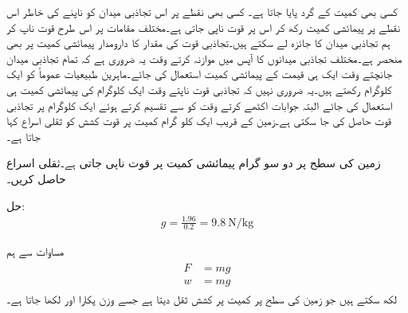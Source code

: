 کسی بھی کمیت  کے گرد   پایا جاتا ہے۔ کسی بھی نقطے پر  اس تجاذبی میدان کو ناپنے کی خاطر اس نقطے پر پیمائشی کمیت  رکھ کر اس پر قوت ناپی جاتی ہے۔مختلف مقامات پر اس طرح قوت ناپ کر ہم تجاذبی میدان کا جائزہ لے سکتے ہیں۔تجاذبی قوت کی مقدار کا دارومدار پیمائشی کمیت   پر بھی منحصر ہے۔مختلف تجاذبی میدانوں کا آپس میں موازنہ کرتے وقت یہ ضروری ہے کہ تمام تجاذبی میدان جانچتے وقت ایک ہی قیمت کے پیمائشی کمیت استعمال کی جائے۔ماہرین طبیعیات عموماً  کو ایک کلوگرام  رکھتے ہیں۔یہ ضروری نہیں کہ تجاذبی قوت ناپتے وقت ایک کلوگرام کی پیمائشی کمیت ہی استعمال کی جائے البتہ جوابات اکٹھے کرتے وقت  کو  سے تقسیم کرتے ہوئے ایک کلوگرام پر تجاذبی قوت حاصل کی جا سکتی ہے۔زمین کے قریب ایک کلو گرام کمیت پر قوت کشش کو ثقلی اسراع  کہا جاتا ہے۔

زمین کی سطح پر دو سو گرام پیمائشی کمیت پر  قوت ناپی جاتی ہے۔ثقلی اسراع حاصل کریں۔

حل:
\begin{align}
g=\frac{1.96}{0.2}=\SI{9.8}{\newton \per \kilogram}
\end{align}   

مساوات  سے ہم
\begin{gather}
\begin{aligned}
F&=m g\\
w&=m g
\end{aligned}
\end{gather}
لکھ سکتے ہیں جو زمین کی  سطح پر کمیت  پر کشش ثقل  دیتا ہے جسے  وزن پکارا اور   لکھا جاتا ہے۔
  
